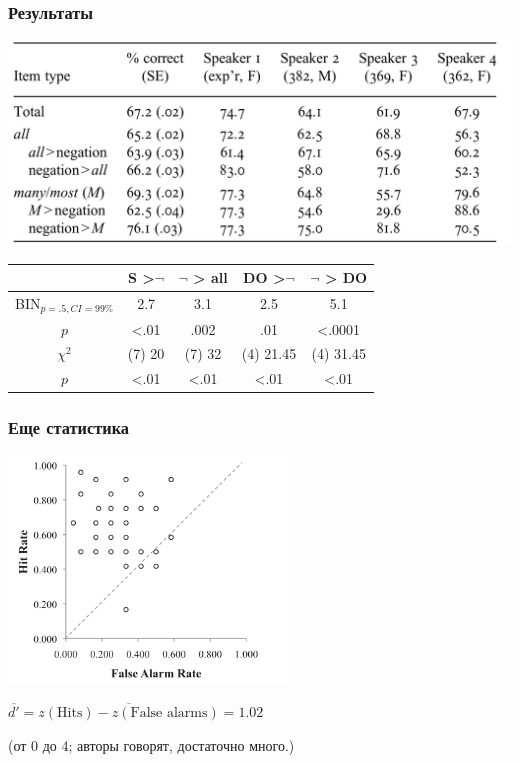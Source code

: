 \documentclass{beamer}
\begin{document}
\begin{frame}
    \frametitle{Результаты}

    \includegraphics[width=\textwidth]{images/results 1.png}


    \pause

    \begin{table}[stats]
        \centering
        \begin{tabular}{c | c c | c c}
            &                      S >$\neg$ & $\neg$ > all & DO >$\neg$ & $\neg$ > DO\\
            \hline
            BIN$_{p=.5, CI=99\%}$ & 2.7        & 3.1        & 2.5         & 5.1\\
            $p$                   & <.01       & .002       & .01         & <.0001\\
            \hline
            $\chi^2$              & (7) 20     & (7) 32     & (4) 21.45   & (4) 31.45\\
            $p$                   & <.01       & <.01       & <.01         & <.01\\
        \end{tabular}
        \label{<stats1>}
    \end{table}

\end{frame}

\begin{frame}
    \frametitle{Еще статистика}

    \includegraphics[width=20em]{images/hit n miss.png}

    $\overline{d'} = \overline{z(\text{Hits}) - z(\text{False alarms})} = 1.02$
    
    (от 0 до 4; авторы говорят, достаточно много.)

\end{frame}
\end{document}

